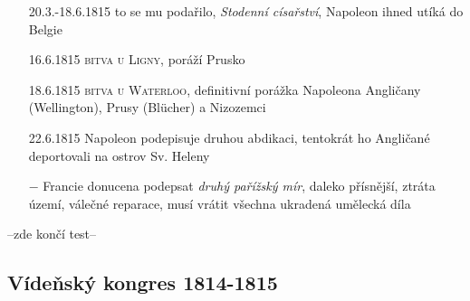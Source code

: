 \documentclass{article}
\begin{document}
\begin{itemize}
    \item[20.3.-18.6.1815] to se mu podařilo, \textit{Stodenní císařství}, Napoleon ihned utíká do Belgie
    \item[16.6.1815] \textsc{bitva u Ligny}, poráží Prusko
    \item[18.6.1815]  \textsc{bitva u Waterloo}, definitivní porážka Napoleona Angličany (Wellington), Prusy (Blücher) a Nizozemci
    \item[22.6.1815] Napoleon podepisuje druhou abdikaci, tentokrát ho Angličané deportovali na ostrov Sv. Heleny
    \item[$-$] Francie donucena podepsat \textit{druhý pařížský mír}, daleko přísnější, ztráta území, válečné reparace, musí vrátit všechna ukradená umělecká díla
\end{itemize}
--zde končí test--
\subsection*{Vídeňský kongres 1814-1815}
\end{document}
